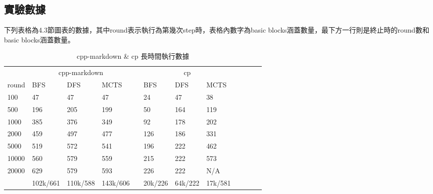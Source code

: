 \documentclass[12pt,a4paper,oneside]{book}
\begin{document}
\begin{appendices}
\chapter{實驗數據}

下列表格為4.3節圖表的數據，其中round表示執行為第幾次step時，表格內數字為basic blocks涵蓋數量，最下方一行則是終止時的round數和basic blocks涵蓋數量。

\begin{table}[htbp]
\centering
\caption{cpp-markdown \& cp 長時間執行數據}
\label{testMethodB}
\begin{tabular}{@{}llllllllllll@{}} \toprule
             & \multicolumn{3}{c}{cpp-markdown} & \phantom{abc} & \multicolumn{3}{c}{cp} \\ \cmidrule{2-4} \cmidrule{6-8}
round      & BFS   & DFS  & MCTS & & BFS   & DFS & MCTS     \\ \midrule
100        & 47    & 47   & 47   & & 24    & 47  & 38       \\
500        & 196   & 205  & 199  & & 50    & 164 & 119      \\
1000       & 385   & 376  & 349  & & 92    & 178 & 202      \\
2000       & 459   & 497  & 477  & & 126   & 186 & 331      \\
5000       & 519   & 572  & 541  & & 196   & 222 & 462      \\
10000      & 560   & 579  & 559  & & 215   & 222 & 573      \\
20000      & 629   & 579  & 593  & & 226   & 222 & N/A      \\
& 102k/661 & 110k/588 & 143k/606 & & 20k/226 & 64k/222 & 17k/581     \\ \bottomrule
\end{tabular}
\end{table}


\end{appendices}
\end{document}
